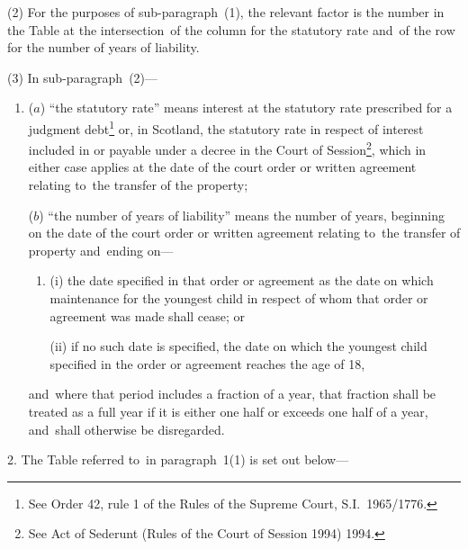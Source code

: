 \documentclass[12pt,a4paper]{article}
\begin{document}
(2) For the purposes of sub-paragraph~(1), the relevant factor is the number in
the Table at the intersection~of the column for the statutory rate and~of the
row for the number of years of liability.

(3) In sub-paragraph~(2)—
\begin{enumerate}\item[]
($a$) “the statutory rate” means interest at the statutory rate prescribed for a
judgment debt\footnote{\frenchspacing See Order 42, rule 1 of the Rules of the Supreme Court, S.I.~1965/1776.} or, in Scotland, the statutory rate in respect of interest
included in or payable under a decree in the Court of Session\footnote{\frenchspacing See Act of Sederunt (Rules of the Court of Session 1994) 1994.}, which in
either case applies at the date of the court order or written agreement relating
to~the transfer of the property;

($b$) “the number of years of liability” means the number of years, beginning on
the date of the court order or written agreement relating to~the transfer of
property and~ending on—
\begin{enumerate}\item[]
(i) the date specified in that order or agreement as the date on which
maintenance for the youngest child in respect of whom that order or agreement
was made shall cease; or

(ii) if no such date is specified, the date on which the youngest child specified
in the order or agreement reaches the age of 18,
\end{enumerate}
and~where that period includes a fraction of a year, that fraction shall be
treated as a full year if it is either one half or exceeds one half of a year,
and~shall otherwise be disregarded.
\end{enumerate}

\medskip

2.  The Table referred to~in paragraph~1(1) is set out below—

\end{document}
